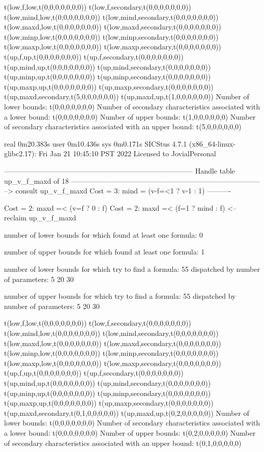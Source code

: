 t(low,f,low,t(0,0,0,0,0,0,0))
t(low,f,secondary,t(0,0,0,0,0,0,0))
t(low,mind,low,t(0,0,0,0,0,0,0))
t(low,mind,secondary,t(0,0,0,0,0,0,0))
t(low,maxd,low,t(0,0,0,0,0,0,0))
t(low,maxd,secondary,t(0,0,0,0,0,0,0))
t(low,minp,low,t(0,0,0,0,0,0,0))
t(low,minp,secondary,t(0,0,0,0,0,0,0))
t(low,maxp,low,t(0,0,0,0,0,0,0))
t(low,maxp,secondary,t(0,0,0,0,0,0,0))
t(up,f,up,t(0,0,0,0,0,0,0))
t(up,f,secondary,t(0,0,0,0,0,0,0))
t(up,mind,up,t(0,0,0,0,0,0,0))
t(up,mind,secondary,t(0,0,0,0,0,0,0))
t(up,minp,up,t(0,0,0,0,0,0,0))
t(up,minp,secondary,t(0,0,0,0,0,0,0))
t(up,maxp,up,t(0,0,0,0,0,0,0))
t(up,maxp,secondary,t(0,0,0,0,0,0,0))
t(up,maxd,secondary,t(5,0,0,0,0,0,0))
t(up,maxd,up,t(1,0,0,0,0,0,0))
Number of lower bounds:                                             t(0,0,0,0,0,0,0)
Number of secondary characteristics associated with a lower bound:  t(0,0,0,0,0,0,0)
Number of upper bounds:                                             t(1,0,0,0,0,0,0)
Number of secondary characteristics associated with an upper bound: t(5,0,0,0,0,0,0)

real	0m20.383s
user	0m10.436s
sys	0m0.171s
SICStus 4.7.1 (x86_64-linux-glibc2.17): Fri Jan 21 10:45:10 PST 2022
Licensed to JovialPersonal


--------------------------------------------------------------------------------
Handle table up_v_f_maxd of 18
--------------------------------------------------------------------------------
--> consult up_v_f_maxd
Cost =  3:  mind = (v-f=<1 ? v-1 : 1)
----------

Cost =  2:  maxd =< (v=f ? 0 : f)
Cost =  2:  maxd =< (f=1 ? mind : f)
<-- reclaim up_v_f_maxd

number of lower bounds for which found at least one formula: 0

number of upper bounds for which found at least one formula: 1

number of lower bounds for which try to find a formula: 55
dispatched by number of parameters: 5  20  30

number of upper bounds for which try to find a formula: 55
dispatched by number of parameters: 5  20  30

t(low,f,low,t(0,0,0,0,0,0,0))
t(low,f,secondary,t(0,0,0,0,0,0,0))
t(low,mind,low,t(0,0,0,0,0,0,0))
t(low,mind,secondary,t(0,0,0,0,0,0,0))
t(low,maxd,low,t(0,0,0,0,0,0,0))
t(low,maxd,secondary,t(0,0,0,0,0,0,0))
t(low,minp,low,t(0,0,0,0,0,0,0))
t(low,minp,secondary,t(0,0,0,0,0,0,0))
t(low,maxp,low,t(0,0,0,0,0,0,0))
t(low,maxp,secondary,t(0,0,0,0,0,0,0))
t(up,f,up,t(0,0,0,0,0,0,0))
t(up,f,secondary,t(0,0,0,0,0,0,0))
t(up,mind,up,t(0,0,0,0,0,0,0))
t(up,mind,secondary,t(0,0,0,0,0,0,0))
t(up,minp,up,t(0,0,0,0,0,0,0))
t(up,minp,secondary,t(0,0,0,0,0,0,0))
t(up,maxp,up,t(0,0,0,0,0,0,0))
t(up,maxp,secondary,t(0,0,0,0,0,0,0))
t(up,maxd,secondary,t(0,1,0,0,0,0,0))
t(up,maxd,up,t(0,2,0,0,0,0,0))
Number of lower bounds:                                             t(0,0,0,0,0,0,0)
Number of secondary characteristics associated with a lower bound:  t(0,0,0,0,0,0,0)
Number of upper bounds:                                             t(0,2,0,0,0,0,0)
Number of secondary characteristics associated with an upper bound: t(0,1,0,0,0,0,0)

